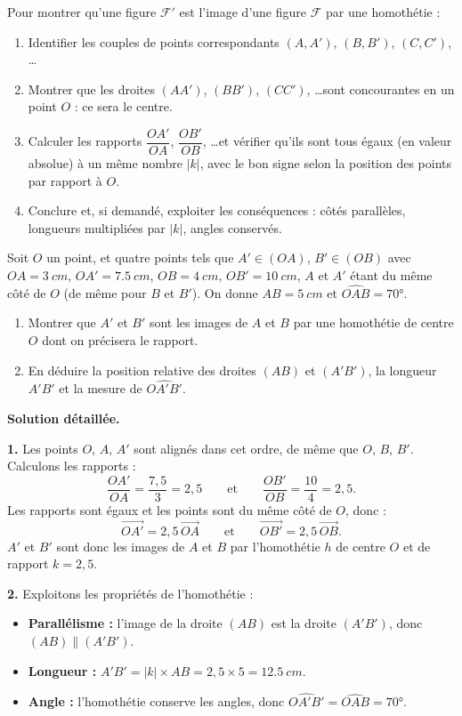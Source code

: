 \documentclass[11pt]{article}
\begin{document}
\begin{methode}
Pour montrer qu'une figure $\mathcal{F}'$ est l'image d'une figure $\mathcal{F}$ par une homothétie :
\begin{enumerate}
\item Identifier les couples de points correspondants $(A, A')$, $(B, B')$, $(C, C')$, \dots
\item Montrer que les droites $(AA')$, $(BB')$, $(CC')$, \dots sont concourantes en un point $O$ : ce sera le centre.
\item Calculer les rapports $\dfrac{OA'}{OA}$, $\dfrac{OB'}{OB}$, \dots et vérifier qu'ils sont tous égaux (en valeur absolue) à un même nombre $|k|$, avec le bon signe selon la position des points par rapport à $O$.
\item Conclure et, si demandé, exploiter les conséquences : côtés parallèles, longueurs multipliées par $|k|$, angles conservés.
\end{enumerate}
\end{methode}

\begin{exoresolu}
Soit $O$ un point, et quatre points tels que $A' \in (OA)$, $B' \in (OB)$ avec $OA = \SI{3}{cm}$, $OA' = \SI{7,5}{cm}$, $OB = \SI{4}{cm}$, $OB' = \SI{10}{cm}$, $A$ et $A'$ étant du même côté de $O$ (de même pour $B$ et $B'$). On donne $AB = \SI{5}{cm}$ et $\widehat{OAB} = 70°$.
\begin{enumerate}
\item Montrer que $A'$ et $B'$ sont les images de $A$ et $B$ par une homothétie de centre $O$ dont on précisera le rapport.
\item En déduire la position relative des droites $(AB)$ et $(A'B')$, la longueur $A'B'$ et la mesure de $\widehat{OA'B'}$.
\end{enumerate}
\tcblower
\textbf{Solution détaillée.}

\textbf{1.} Les points $O$, $A$, $A'$ sont alignés dans cet ordre, de même que $O$, $B$, $B'$. Calculons les rapports :
\[ \dfrac{OA'}{OA} = \dfrac{7,5}{3} = 2,5 \qquad \text{et} \qquad \dfrac{OB'}{OB} = \dfrac{10}{4} = 2,5. \]
Les rapports sont égaux et les points sont du même côté de $O$, donc :
\[ \overrightarrow{OA'} = 2,5\,\overrightarrow{OA} \qquad \text{et} \qquad \overrightarrow{OB'} = 2,5\,\overrightarrow{OB}. \]
$A'$ et $B'$ sont donc les images de $A$ et $B$ par l'homothétie $h$ de centre $O$ et de rapport $k = 2,5$.

\textbf{2.} Exploitons les propriétés de l'homothétie :
\begin{itemize}
\item \textbf{Parallélisme :} l'image de la droite $(AB)$ est la droite $(A'B')$, donc $(AB) \parallel (A'B')$.
\item \textbf{Longueur :} $A'B' = |k| \times AB = 2,5 \times 5 = \SI{12,5}{cm}$.
\item \textbf{Angle :} l'homothétie conserve les angles, donc $\widehat{OA'B'} = \widehat{OAB} = 70°$.
\end{itemize}
\end{exoresolu}
\end{document}
